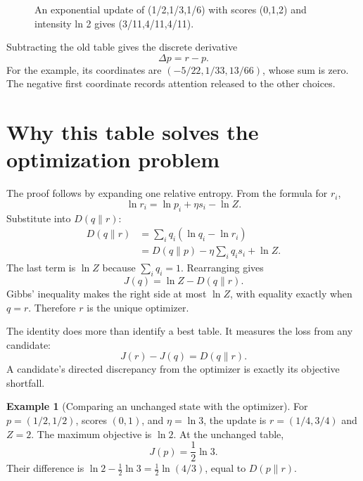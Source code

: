 \documentclass[11pt,oneside,openany]{book}
\theoremstyle{definition}
\newtheorem{example}{Example}[chapter]
\theoremstyle{remark}
\numberwithin{equation}{chapter}
\begin{document}
\begin{figure}[htbp]\centering
{}
\caption{An exponential update of (1/2,1/3,1/6) with scores (0,1,2) and intensity ln 2 gives (3/11,4/11,4/11).}\end{figure}

Subtracting the old table gives the discrete derivative \[\Delta p=r-p.\] For the example, its coordinates are \((-5/22,1/33,13/66)\), whose sum is zero. The negative first coordinate records attention released to the other choices.

\section{Why this table solves the optimization problem}\label{ch09-why-this-table-solves-the-optimization-problem}

The proof follows by expanding one relative entropy. From the formula for \(r_i\), \[\ln r_i=\ln p_i+\eta s_i-\ln Z.\] Substitute into \(D(q\|r)\): \[\begin{aligned}
D(q\|r)
&=\sum_i q_i(\ln q_i-\ln r_i)\\
&=D(q\|p)-\eta\sum_iq_i s_i+\ln Z.
\end{aligned}\] The last term is \(\ln Z\) because \(\sum_iq_i=1\). Rearranging gives \[\boxed{J(q)=\ln Z-D(q\|r).}\] Gibbs' inequality makes the right side at most \(\ln Z\), with equality exactly when \(q=r\). Therefore \(r\) is the unique optimizer.

The identity does more than identify a best table. It measures the loss from any candidate: \[J(r)-J(q)=D(q\|r).\] A candidate's directed discrepancy from the optimizer is exactly its objective shortfall.

\begin{example}[Comparing an unchanged state with the optimizer]

For \(p=(1/2,1/2)\), scores \((0,1)\), and \(\eta=\ln3\), the update is \(r=(1/4,3/4)\) and \(Z=2\). The maximum objective is \(\ln2\). At the unchanged table, \[J(p)=\frac12\ln3.\] Their difference is \(\ln2-\tfrac12\ln3=\tfrac12\ln(4/3)\), equal to \(D(p\|r)\).

\end{example}
\end{document}
